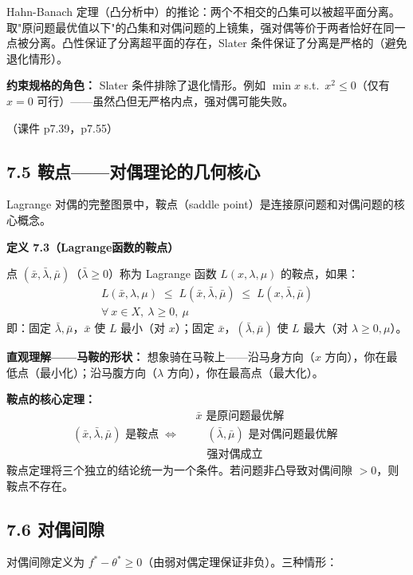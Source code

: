 Hahn-Banach 定理（凸分析中）的推论：两个不相交的凸集可以被超平面分离。取"原问题最优值以下"的凸集和对偶问题的上镜集，强对偶等价于两者恰好在同一点被分离。凸性保证了分离超平面的存在，Slater 条件保证了分离是严格的（避免退化情形）。

\textbf{约束规格的角色：} Slater 条件排除了退化情形。例如 $\min x$ s.t.\ $x^2\le 0$（仅有 $x=0$ 可行）——虽然凸但无严格内点，强对偶可能失败。

（课件 p7.39，p7.55）

\subsection{7.5 鞍点——对偶理论的几何核心}

Lagrange 对偶的完整图景中，鞍点（saddle point）是连接原问题和对偶问题的核心概念。

\textbf{定义 7.3（Lagrange函数的鞍点）}

点 $(\bar{x}, \bar{\lambda}, \bar{\mu})$（$\bar{\lambda}\ge0$）称为 Lagrange 函数 $L(x,\lambda,\mu)$ 的鞍点，如果：
\begin{align*}
L(\bar{x},\lambda,\mu) \;\le\; L(\bar{x},\bar{\lambda},\bar{\mu})
\;\le\; L(x,\bar{\lambda},\bar{\mu}) \\[-2pt]
\forall\ x\in X,\ \lambda\ge0,\ \mu
\end{align*}
即：固定 $\bar{\lambda},\bar{\mu}$，$\bar{x}$ 使 $L$ 最小（对 $x$）；固定 $\bar{x}$，$(\bar{\lambda},\bar{\mu})$ 使 $L$ 最大（对 $\lambda\ge0,\mu$）。

\textbf{直观理解——马鞍的形状：} 想象骑在马鞍上——沿马身方向（$x$ 方向），你在最低点（最小化）；沿马腹方向（$\lambda$ 方向），你在最高点（最大化）。

\textbf{鞍点的核心定理：}
\[
(\bar{x},\bar{\lambda},\bar{\mu}) \text{ 是鞍点}
\;\Longleftrightarrow\;
\begin{aligned}
&\bar{x} \text{ 是原问题最优解} \\
&\quad (\bar{\lambda},\bar{\mu}) \text{ 是对偶问题最优解} \\
&\quad \text{强对偶成立}
\end{aligned}
\]
鞍点定理将三个独立的结论统一为一个条件。若问题非凸导致对偶间隙 $>0$，则鞍点不存在。

\subsection{7.6 对偶间隙}

对偶间隙定义为 $f^* - \theta^* \ge 0$（由弱对偶定理保证非负）。三种情形：

